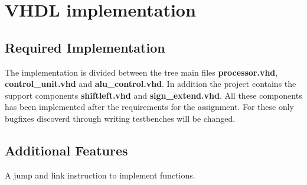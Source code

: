 \section{VHDL implementation}

\subsection{Required Implementation}
The implementation is divided between the tree main files {\bf processor.vhd}, {\bf control\_unit.vhd} and {\bf alu\_control.vhd}. In addition the project contains the support components {\bf shiftleft.vhd} and {\bf sign\_extend.vhd}. All these components has been implemented after the requirements for the assignment. For these only bugfixes discoverd through writing testbenches will be changed. 

\subsection{Additional Features}
A jump and link instruction to implement functions. 
